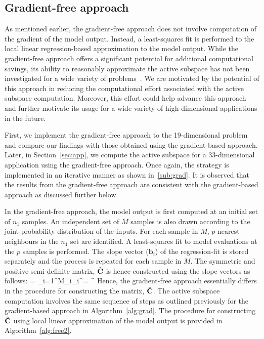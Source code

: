 \subsection{Gradient-free approach}
\label{sub:gradfree}

As mentioned earlier, the gradient-free approach does not involve computation
of the gradient of the model output. Instead, a least-squares fit is performed
to the local linear regression-based approximation to the model output. While
the gradient-free approach offers a significant potential for additional
computational savings, its ability to reasonably approximate the active
subspace has not been investigated for a wide variety of
problems~\cite{Constantine:2015}. We are motivated by the
potential of this approach in reducing the computational effort
associated with the active subspace computation. Moreover, this effort could
help advance this approach and further motivate its usage for a wide variety of
high-dimensional applications in the future. 

First, we implement the gradient-free approach to the 19-dimensional problem and compare our findings with
those obtained using the gradient-based approach. Later, in
Section~\ref{sec:app}, we compute the active subspace for a 33-dimensional application using the gradient-free
approach. Once again, the strategy is implemented in an iterative manner as shown in~\ref{sub:grad}. 
It is observed that the results from the gradient-free approach are consistent with the gradient-based approach
as discussed further below.

In the gradient-free approach, the model output is first computed at an initial set of $n_1$ samples. An independent
set of $M$ samples is also drawn according to the joint probability distribution of the inputs. For each sample
in $M$, $p$ nearest neighbours in the $n_1$ set are identified. A least-squares fit to model evaluations at
the $p$ samples is performed. The slope vector ($\bm{b}_i$) of the regression-fit is stored separately and the process is
repeated for each sample in $M$. The symmetric and positive semi-definite matrix, $\hat{\mathbf{{C}}}$ is hence constructed
using the slope vectors as follows:
%
\be
{} = \sum\limits_{i=1}^{M}_i_i^\top = \hat{\bm{\Lambda}}^\top
\ee
%
Hence, the gradient-free approach essentially differs in the procedure for constructing the matrix, $\hat{\mathbf{{C}}}$.
The active subspace computation involves the same sequence of steps as outlined previously for the gradient-based 
approach in Algorithm~\ref{alg:grad}. The procedure for constructing $\hat{\mathbf{{C}}}$ using local linear approximation
of the model output is provided in Algorithm~\ref{alg:free2}.

